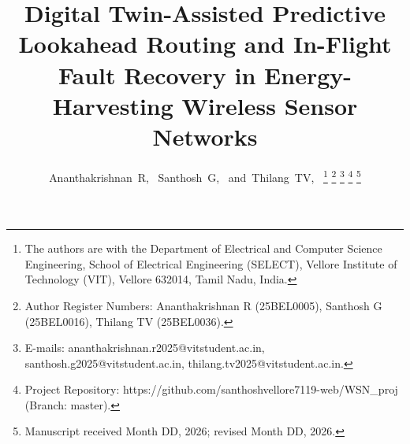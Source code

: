 \documentclass[journal]{IEEEtran}
\begin{document}
\title{Digital Twin-Assisted Predictive Lookahead Routing and In-Flight Fault Recovery in Energy-Harvesting Wireless Sensor Networks}

\author{Ananthakrishnan~R,~
        Santhosh~G,~
        and~Thilang~TV,~%
\thanks{The authors are with the Department of Electrical and Computer Science Engineering, School of Electrical Engineering (SELECT), Vellore Institute of Technology (VIT), Vellore 632014, Tamil Nadu, India.}%
\thanks{Author Register Numbers: Ananthakrishnan R (25BEL0005), Santhosh G (25BEL0016), Thilang TV (25BEL0036).}%
\thanks{E-mails: ananthakrishnan.r2025@vitstudent.ac.in, santhosh.g2025@vitstudent.ac.in, thilang.tv2025@vitstudent.ac.in.}%
\thanks{Project Repository: https://github.com/santhoshvellore7119-web/WSN\_proj (Branch: master).}%
\thanks{Manuscript received Month DD, 2026; revised Month DD, 2026.}}

\maketitle
\end{document}
